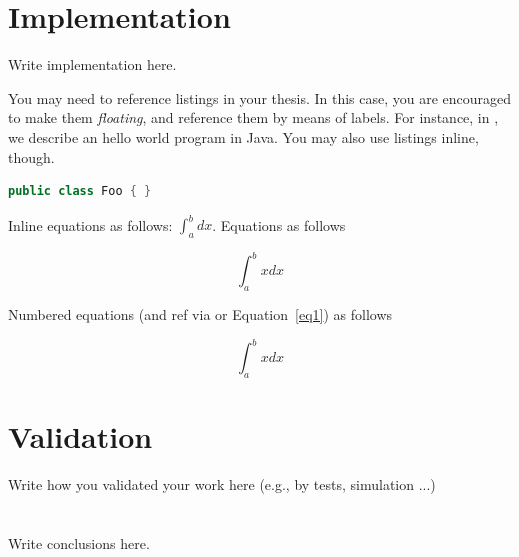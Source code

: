 \documentclass[12pt,a4paper,openright,twoside]{book}
\begin{document}
\chapter{Implementation} %
\label{chap:implementation}

Write implementation here.



You may need to reference listings in your thesis.
%
In this case, you are encouraged to make them \emph{floating}, and reference them by means of labels.
%
For instance, in , we describe an hello world program in Java.
%
You may also use listings inline, though.
\begin{lstlisting}[language={java}]
public class Foo { }
\end{lstlisting}

Inline equations as follows: $\int_a^b dx$. Equations as follows

$$
\int_a^b xdx
$$

Numbered equations (and ref via  or Equation~\ref{eq1}) as follows

\begin{equation}
\label{eq1}
\int_a^b xdx
\end{equation}

\chapter{Validation} %
\label{chap:validation}

Write how you validated your work here (e.g., by tests, simulation ...)

\chapter{\conclusionsname}
\label{chap:conclusions}

Write conclusions here.





\end{document}
